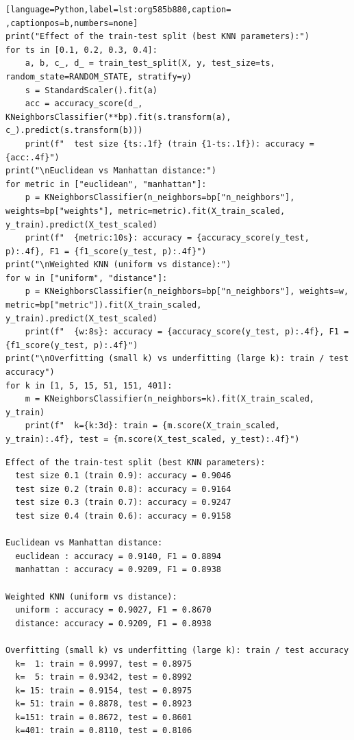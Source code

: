 \documentclass[11pt]{article}
\begin{document}
\begin{lstlisting}[language=Python,label=lst:org585b880,caption= ,captionpos=b,numbers=none]
print("Effect of the train-test split (best KNN parameters):")
for ts in [0.1, 0.2, 0.3, 0.4]:
    a, b, c_, d_ = train_test_split(X, y, test_size=ts, random_state=RANDOM_STATE, stratify=y)
    s = StandardScaler().fit(a)
    acc = accuracy_score(d_, KNeighborsClassifier(**bp).fit(s.transform(a), c_).predict(s.transform(b)))
    print(f"  test size {ts:.1f} (train {1-ts:.1f}): accuracy = {acc:.4f}")
print("\nEuclidean vs Manhattan distance:")
for metric in ["euclidean", "manhattan"]:
    p = KNeighborsClassifier(n_neighbors=bp["n_neighbors"], weights=bp["weights"], metric=metric).fit(X_train_scaled, y_train).predict(X_test_scaled)
    print(f"  {metric:10s}: accuracy = {accuracy_score(y_test, p):.4f}, F1 = {f1_score(y_test, p):.4f}")
print("\nWeighted KNN (uniform vs distance):")
for w in ["uniform", "distance"]:
    p = KNeighborsClassifier(n_neighbors=bp["n_neighbors"], weights=w, metric=bp["metric"]).fit(X_train_scaled, y_train).predict(X_test_scaled)
    print(f"  {w:8s}: accuracy = {accuracy_score(y_test, p):.4f}, F1 = {f1_score(y_test, p):.4f}")
print("\nOverfitting (small k) vs underfitting (large k): train / test accuracy")
for k in [1, 5, 15, 51, 151, 401]:
    m = KNeighborsClassifier(n_neighbors=k).fit(X_train_scaled, y_train)
    print(f"  k={k:3d}: train = {m.score(X_train_scaled, y_train):.4f}, test = {m.score(X_test_scaled, y_test):.4f}")
\end{lstlisting}

\begin{verbatim}
Effect of the train-test split (best KNN parameters):
  test size 0.1 (train 0.9): accuracy = 0.9046
  test size 0.2 (train 0.8): accuracy = 0.9164
  test size 0.3 (train 0.7): accuracy = 0.9247
  test size 0.4 (train 0.6): accuracy = 0.9158

Euclidean vs Manhattan distance:
  euclidean : accuracy = 0.9140, F1 = 0.8894
  manhattan : accuracy = 0.9209, F1 = 0.8938

Weighted KNN (uniform vs distance):
  uniform : accuracy = 0.9027, F1 = 0.8670
  distance: accuracy = 0.9209, F1 = 0.8938

Overfitting (small k) vs underfitting (large k): train / test accuracy
  k=  1: train = 0.9997, test = 0.8975
  k=  5: train = 0.9342, test = 0.8992
  k= 15: train = 0.9154, test = 0.8975
  k= 51: train = 0.8878, test = 0.8923
  k=151: train = 0.8672, test = 0.8601
  k=401: train = 0.8110, test = 0.8106
\end{verbatim}
\end{document}
